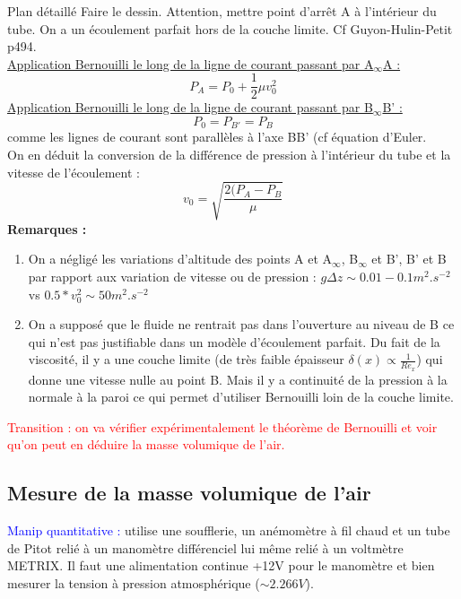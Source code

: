 \begin{reportBlock}{Plan détaillé}
Faire le dessin. Attention, mettre point d'arrêt A à l'intérieur du tube. On a un écoulement parfait hors de la couche limite. Cf Guyon-Hulin-Petit p494.\\

\underline{Application Bernouilli le long de la ligne de courant passant par A$_{\infty}$A :}
\begin{equation}
    P_A = P_0 + \frac{1}{2}\mu v_0^2
\end{equation}
\underline{Application Bernouilli le long de la ligne de courant passant par B$_{\infty}$B' :}
\begin{equation}
    P_{0} = P_{B'} = P_B
\end{equation}
comme les lignes de courant sont parallèles à l'axe BB' (cf équation d'Euler.\\

On en déduit la conversion de la différence de pression à l'intérieur du tube et la vitesse de l'écoulement :
\begin{equation}
    v_0 = \sqrt{\frac{2(P_A-P_B}{\mu}}
\end{equation}
\textbf{Remarques :}
\begin{enumerate}
    \item On a négligé les variations d'altitude des points A et A$_{\infty}$, B$_{\infty}$ et B', B' et B par rapport aux variation de vitesse ou de pression : $g\Delta z\sim 0.01-0.1m^2.s^{-2}$ vs $0.5*v_0^2\sim 50m^2.s^{-2}$
    \item On a supposé que le fluide ne rentrait pas dans l'ouverture au niveau de B ce qui n'est pas justifiable dans un modèle d'écoulement parfait. Du fait de la viscosité, il y a une couche limite (de très faible épaisseur $\delta(x)\propto\frac{1}{Re_x}$) qui donne une vitesse nulle au point B. Mais il y a continuité de la pression à la normale à la paroi ce qui permet d'utiliser Bernouilli loin de la couche limite.
\end{enumerate}

\textcolor{red}{Transition : on va vérifier expérimentalement le théorème de Bernouilli et voir qu'on peut en déduire la masse volumique de l'air.}

\subsection{Mesure de la masse volumique de l'air}

\textcolor{blue}{Manip quantitative :} utilise une soufflerie, un anémomètre à fil chaud et un tube de Pitot relié à un manomètre différenciel lui même relié à un voltmètre METRIX. Il faut une alimentation continue +12V pour le manomètre et bien mesurer la tension à pression atmosphérique ($\sim 2.266V$).\\


\end{reportBlock}
